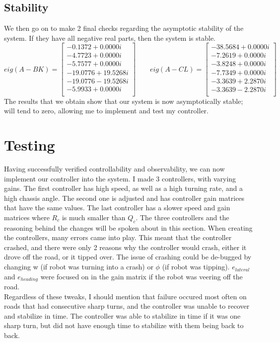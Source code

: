 \documentclass{article}
\begin{document}
\subsection{Stability}
We then go on to make 2 final checks regarding the asymptotic stability of the system. If they have all negative real parts, then the system is stable.
\begin{equation*}
    eig(A-BK) = \begin{bmatrix}
-0.1372 + 0.0000i\\
  -4.7723 + 0.0000i\\
  -5.7577 + 0.0000i\\
 -19.0776 +19.5268i\\
 -19.0776 -19.5268i\\
  -5.9933 + 0.0000i\\
    \end{bmatrix} \qquad eig(A-CL) = \begin{bmatrix}
-38.5684 + 0.0000i\\
  -7.2619 + 0.0000i\\
  -3.8248 + 0.0000i\\
  -7.7349 + 0.0000i\\
  -3.3639 + 2.2870i\\
  -3.3639 - 2.2870i\\
    \end{bmatrix}
\end{equation*}
The results that we obtain show that our system is now asymptotically stable; will tend to zero, allowing me to implement and test my controller.

\section{Testing}
Having successfully verified controllability and observability, we can now implement our controller into the system. I made 3 controllers, with varying gains. The first controller has high speed, as well as a high turning rate, and a high chassis angle. The second one is adjusted and has controller gain matrices that have the same values. The last controller has a slower speed and gain matrices where $R_{c}$ is much smaller than $Q_{c}$. The three controllers and the reasoning behind the changes will be spoken about in this section. When creating the controllers, many errors came into play. This meant that the controller crashed, and there were only 2 reasons why the controller would crash, either it drove off the road, or it tipped over. The issue of crashing could be de-bugged by changing w (if robot was turning into a crash) or $\phi$ (if robot was tipping). $e_{lateral}$ and $e_{heading}$ were focused on in the gain matrix if the robot was veering off the road.\\
Regardless of these tweaks, I should mention that failure occured most often on roads that had consecutive sharp turns, and the controller was unable to recover and stabilize in time. The controller was able to stabilize in time if it was one sharp turn, but did not have enough time to stabilize with them being back to back.
\end{document}
